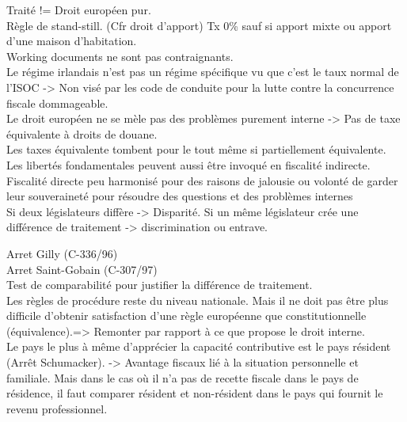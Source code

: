 \documentclass{book}
\begin{document}
Traité != Droit européen pur.\\

Règle de stand-still. (Cfr droit d'apport) Tx 0\% sauf si apport mixte ou apport d'une maison d'habitation.\\

Working documents ne sont pas contraignants.\\

Le régime irlandais n'est pas un régime spécifique vu que c'est le taux normal de l'ISOC -> Non visé par les code de conduite pour la lutte contre la concurrence fiscale dommageable.\\


Le droit européen ne se mèle pas des problèmes purement interne -> Pas de taxe équivalente à droits de douane.\\

Les taxes équivalente tombent pour le tout même si partiellement équivalente.\\

Les libertés fondamentales peuvent aussi être invoqué en fiscalité indirecte.\\

Fiscalité directe peu harmonisé pour des raisons de jalousie ou volonté de garder leur souveraineté pour résoudre des questions et des problèmes internes\\

Si deux législateurs diffère -> Disparité.
Si un même législateur crée une différence de traitement -> discrimination ou entrave. 

Arret Gilly (C-336/96)\\ 

Arret Saint-Gobain (C-307/97)\\


Test de comparabilité pour justifier la différence de traitement.\\

Les règles de procédure reste du niveau nationale. Mais il ne doit pas être plus difficile d'obtenir satisfaction d'une règle européenne que constitutionnelle (équivalence).=> Remonter par rapport à ce que propose  le droit interne.\\

Le pays le plus à même d'apprécier la capacité contributive est le pays résident (Arrêt Schumacker). -> Avantage fiscaux lié à la situation personnelle et familiale. Mais dans le cas où il n'a pas de recette fiscale dans le pays de résidence, il faut comparer résident et non-résident dans le pays qui fournit le revenu professionnel.\\
\end{document}
